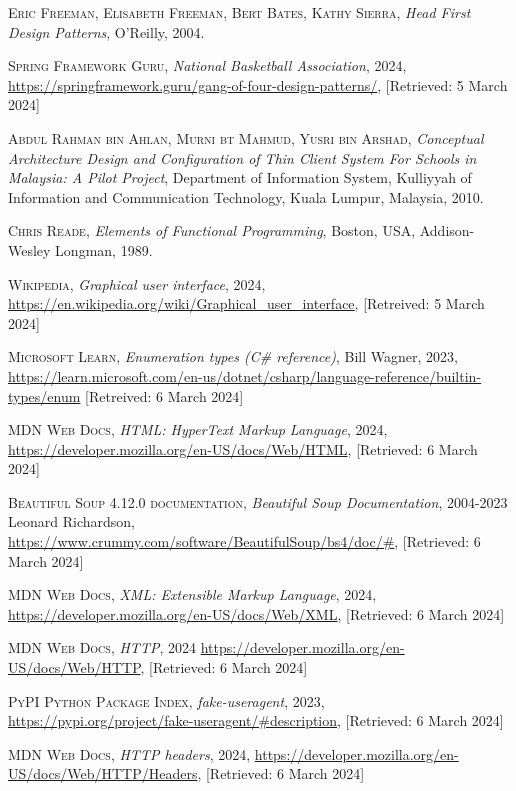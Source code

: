 \documentclass{thesis-ekf}
\theoremstyle{definition}
\theoremstyle{remark}
\begin{document}
{\begin{thebibliography}{2}
\textsc{Eric Freeman, Elisabeth Freeman, Bert Bates, Kathy Sierra},
\emph{Head First Design Patterns},
O'Reilly, 2004.

\textsc{Spring Framework Guru},
\emph{National Basketball Association}, 2024, 
\url{https://springframework.guru/gang-of-four-design-patterns/}, [Retrieved: 5 March 2024]

\textsc{Abdul Rahman bin Ahlan, Murni bt Mahmud, Yusri bin Arshad},
\emph{Conceptual Architecture Design and Configuration of Thin Client System For Schools in Malaysia: A Pilot Project}, 
Department of Information System, Kulliyyah of Information and Communication Technology,
Kuala Lumpur, Malaysia, 2010.

\textsc{Chris Reade},
\emph{Elements of Functional Programming}, 
Boston, USA, Addison-Wesley Longman, 1989.

\textsc{Wikipedia},
\emph{Graphical user interface}, 2024,
\url{https://en.wikipedia.org/wiki/Graphical_user_interface}, [Retreived: 5 March 2024]

\textsc{Microsoft Learn},
\emph{Enumeration types (C\# reference)}, Bill Wagner, 2023,
\url{https://learn.microsoft.com/en-us/dotnet/csharp/language-reference/builtin-types/enum} [Retreived: 6 March 2024]

\textsc{MDN Web Docs},
\emph{HTML: HyperText Markup Language}, 2024,
\url{https://developer.mozilla.org/en-US/docs/Web/HTML}, [Retrieved: 6 March 2024]

\textsc{Beautiful Soup 4.12.0 documentation}, 
\emph{Beautiful Soup Documentation}, 2004-2023 Leonard Richardson,
\url{https://www.crummy.com/software/BeautifulSoup/bs4/doc/#}, [Retrieved: 6 March 2024]

\textsc{MDN Web Docs}, 
\emph{XML: Extensible Markup Language}, 2024,
\url{https://developer.mozilla.org/en-US/docs/Web/XML}, [Retrieved: 6 March 2024]

\textsc{MDN Web Docs}, 
\emph{HTTP}, 2024
\url{https://developer.mozilla.org/en-US/docs/Web/HTTP}, [Retrieved: 6 March 2024]

\textsc{PyPI Python Package Index},
\emph{fake-useragent}, 2023,
\url{https://pypi.org/project/fake-useragent/#description}, [Retrieved: 6 March 2024]

\textsc{MDN Web Docs}, 
\emph{HTTP headers}, 2024,
\url{https://developer.mozilla.org/en-US/docs/Web/HTTP/Headers}, [Retrieved: 6 March 2024]


\end{thebibliography}}
\end{document}
